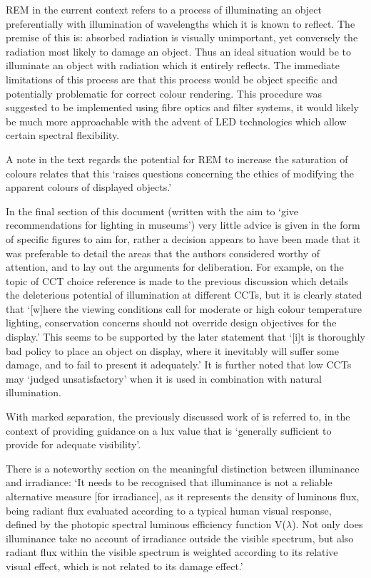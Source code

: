 \gls{REM} in the current context refers to a process of illuminating an object preferentially with illumination of wavelengths which it is known to reflect. The premise of this is: absorbed radiation is visually unimportant, yet conversely the radiation most likely to damage an object. Thus an ideal situation would be to illuminate an object with radiation which it entirely reflects. The immediate limitations of this process are that this process would be object specific and potentially problematic for correct colour rendering. This procedure was suggested to be implemented using fibre optics and filter systems, it would likely be much more approachable with the advent of LED technologies which allow certain spectral flexibility.

A note in the text regards the potential for \gls{REM} to increase the saturation of colours relates that this `raises questions concerning the ethics of modifying the apparent colours of displayed objects.' 


In the final section of this document (written with the aim to `give recommendations for lighting in museums') very little advice is given in the form of specific figures to aim for, rather a decision appears to have been made that it was preferable to detail the areas that the authors considered worthy of attention, and to lay out the arguments for deliberation. For example, on the topic of \gls{CCT} choice reference is made to the previous discussion which details the deleterious potential of illumination at different \glspl{CCT}, but it is clearly stated that `[w]here the viewing conditions call for moderate or high colour temperature lighting, conservation concerns should not override design objectives for the display.' This seems to be supported by the later statement that `[i]t is thoroughly bad policy to place an object on display, where it inevitably will suffer some damage, and to fail to present it adequately.' It is further noted that low \glspl{CCT} may `judged unsatisfactory' when it is used in combination with natural illumination. 

With marked separation, the previously discussed work of \citet{loe_preferred_1982} is referred to, in the context of providing guidance on a lux value that is `generally sufficient to provide for adequate visibility'.

There is a noteworthy section on the meaningful distinction between illuminance and irradiance: `It needs to be recognised that illuminance is not a reliable alternative measure [for irradiance], as it represents the density of luminous flux, being radiant flux evaluated according to a typical human visual response, defined by the photopic spectral luminous efficiency function V($\lambda$). Not only does illuminance take no account of irradiance outside the visible spectrum, but also radiant flux within the visible spectrum is weighted according to its relative visual effect, which is not related to its damage effect.'

